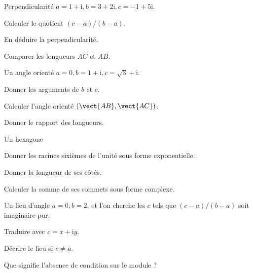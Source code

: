 \begingroup\renewcommand{\otBesoinPlace}[1]{}\begin{minipage}{\linewidth}
\begin{exercice}[2]{Perpendicularité}
$a=1+\mathrm i,b=3+2\mathrm i,c=-1+5\mathrm i$.
\begin{questions}
\item Calculer le quotient $(c-a)/(b-a)$.
\item En déduire la perpendicularité.
\item Comparer les longueurs $AC$ et $AB$.
\end{questions}
\end{exercice}
\begin{exercice}[2]{Un angle orienté}
$a=0,b=1+\mathrm i,c=\sqrt3+\mathrm i$.
\begin{questions}
\item Donner les arguments de $b$ et $c$.
\item Calculer l’angle orienté $(\vect{AB},\vect{AC})$.
\item Donner le rapport des longueurs.
\end{questions}
\end{exercice}
\begin{exercice}[2]{Un hexagone}

\begin{questions}
\item Donner les racines sixièmes de l’unité sous forme exponentielle.
\item Donner la longueur de ses côtés.
\item Calculer la somme de ses sommets sous forme complexe.
\end{questions}
\end{exercice}
\begin{exercice}[2]{Un lieu d’angle}
$a=0,b=2$, et l’on cherche les $c$ tels que $(c-a)/(b-a)$ soit imaginaire pur.
\begin{questions}
\item Traduire avec $c=x+\mathrm iy$.
\item Décrire le lieu si $c\ne a$.
\item Que signifie l’absence de condition sur le module ?
\end{questions}
\end{exercice}
\end{minipage}\endgroup
\clearpage
{}
